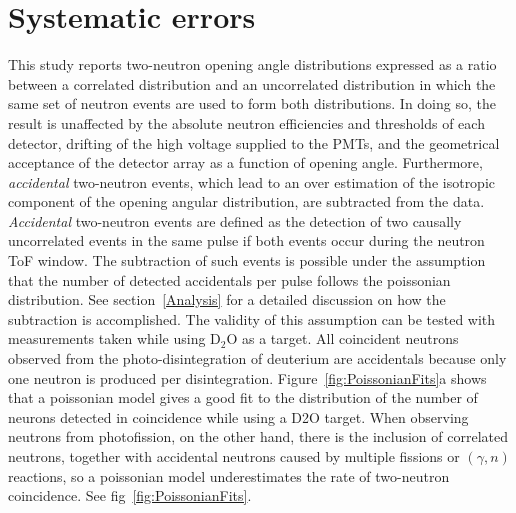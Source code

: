 \section{Systematic errors}
This study reports two-neutron opening angle distributions expressed as a ratio between a correlated distribution and an uncorrelated distribution in which the same set of neutron events are used to form both distributions.
In doing so, the result is unaffected by the absolute neutron efficiencies and thresholds of each detector, drifting of the high voltage supplied to the PMTs, and the geometrical acceptance of the detector array as a function of opening angle.
Furthermore, \textit{accidental} two-neutron events, which lead to an over estimation of the isotropic component of the opening angular distribution, are subtracted from the data.
\textit{Accidental} two-neutron events are defined as the detection of two causally uncorrelated events in the same pulse if both events occur during the neutron ToF window.
The subtraction of such events is possible under the assumption that the number of detected accidentals per pulse follows the poissonian distribution.
See section~\ref{Analysis} for a detailed discussion on how the subtraction is accomplished.
The validity of this assumption can be tested with measurements taken while using D$_2$O as a target.
All coincident neutrons observed from the photo-disintegration of deuterium are accidentals because only one neutron is produced per disintegration.
Figure~\ref{fig:PoissonianFits}a shows that a poissonian model gives a good fit to the distribution of the number of neurons detected in coincidence while using a D2O target.
When observing neutrons from photofission, on the other hand, there is the inclusion of correlated neutrons, together with accidental neutrons caused by multiple fissions or $(\gamma, n)$ reactions, so a poissonian model underestimates the rate of two-neutron coincidence.
See fig~\ref{fig:PoissonianFits}.
